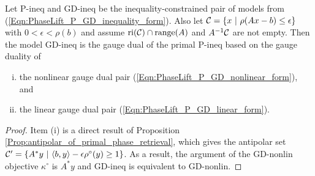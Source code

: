 \begin{enumerate}
\begin{theorem} 				\label{Thm:P-GD-inequality_pair_are_duals}
Let P-ineq and GD-ineq be the inequality-constrained pair of models from (\ref{Eqn:PhaseLift_P_GD_inequality_form}).  Also let ${\mathcal C} = \{ x \ | \ \rho(Ax-b) \leq \epsilon \}$ with $0 < \epsilon < \rho(b)$ and assume $\textnormal{ri}({\mathcal C}) \cap \textnormal{range}(A)$ and $A^{-1}{\mathcal C}$ are not empty.  Then the model GD-ineq is the gauge dual of the primal P-ineq based on the gauge duality of 
\begin{enumerate}[(i)]
\item
the nonlinear gauge dual pair (\ref{Eqn:PhaseLift_P_GD_nonlinear_form}), and
\item
the linear gauge dual pair (\ref{Eqn:PhaseLift_P_GD_linear_form}).
\end{enumerate}
\end{theorem}


\begin{proof}
Item (i) is a direct result of Proposition \ref{Prop:antipolar_of_primal_phase_retrieval}, which gives the antipolar set ${\mathcal C}' = \left\{ A^*y \ | \ \langle b, y \rangle - \epsilon \rho^\circ(y) \geq 1  \right\}$.  As a result, the argument of the GD-nonlin objective $\kappa^\circ$ is $A^*y$ and GD-ineq is equivalent to GD-nonlin.


\end{proof}
\end{enumerate}
